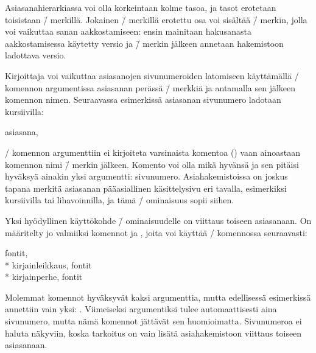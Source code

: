 \noindent
Asiasanahierarkiassa voi olla korkeintaan kolme tasoa, ja tasot
erotetaan toisistaan \koodi{!}\=/ merkillä. Jokainen \koodi{!}\=/
merkillä erotettu osa voi sisältää \=/ merkin, jolla voi
vaikuttaa sanan aakkostamiseen: ensin mainitaan hakusanasta
aakkostamisessa käytetty versio ja \=/ merkin jälkeen annetaan
hakemistoon ladottava versio.

Kirjoittaja voi vaikuttaa asiasanojen sivunumeroiden latomiseen
käyttämällä \-/ komennon argumentissa asiasanan perässä
\koodi{|}\=/ merkkiä ja antamalla sen jälkeen komennon nimen.
Seuraavassa esimerkissä asiasanan sivunumero ladotaan kursiivilla:

\begin{koodilohkosis}
\end{koodilohkosis}

\begin{tulossis}
  asiasana, \textit{}
\end{tulossis}

\noindent
{}\-/ komennon argumenttiin ei kirjoiteta varsinaista
komentoa () vaan ainoastaan komennon nimi \koodi{|}\=/
merkin jälkeen. Komento voi olla mikä hyvänsä ja sen pitäisi hyväksyä
ainakin yksi argumentti: sivunumero. Asiahakemistoissa on joskus tapana
merkitä asiasanan pääasiallinen käsittelysivu eri tavalla, esimerkiksi
kursiivilla tai lihavoinnilla, ja tämä \koodi{|}\=/ ominaisuus sopii
siihen.

Yksi hyödyllinen käyttökohde \koodi{|}\=/ ominaisuudelle on viittaus
toiseen asiasanaan. On määritelty jo valmiiksi komennot  ja
, joita voi käyttää \-/ komennossa
seuraavasti:

\begin{koodilohkosis}
\end{koodilohkosis}

\begin{tulossis}
  fontit,  \\*
  kirjainleikkaus, \textit{\seename} fontit \\*
  kirjainperhe, \textit{\alsoname} fontit
\end{tulossis}

\noindent
Molemmat komennot hyväksyvät kaksi argumenttia, mutta edellisessä
esimerkissä annettiin vain yksi: . Viimeiseksi
argumentiksi tulee automaattisesti aina sivunumero, mutta nämä komennot
jättävät sen huomioimatta. Sivunumeroa ei haluta näkyviin, koska
tarkoitus on vain lisätä asiahakemistoon viittaus toiseen
asiasanaan.

